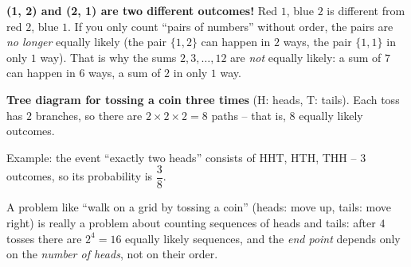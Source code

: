 \begin{warnbox}
\textbf{(1, 2) and (2, 1) are two different outcomes!} Red $1$, blue $2$ is different from red $2$, blue $1$. If you only count ``pairs of numbers'' without order, the pairs are \emph{no longer} equally likely (the pair $\{1,2\}$ can happen in $2$ ways, the pair $\{1,1\}$ in only $1$ way). That is why the sums $2,3,\dots,12$ are \emph{not} equally likely: a sum of $7$ can happen in $6$ ways, a sum of $2$ in only $1$ way.
\end{warnbox}

\textbf{Tree diagram for tossing a coin three times} (H: heads, T: tails). Each toss has $2$ branches, so there are $2\times2\times2=8$ paths -- that is, $8$ equally likely outcomes.
\begin{center}\end{center}
Example: the event ``exactly two heads'' consists of HHT, HTH, THH -- $3$ outcomes, so its probability is $\dfrac38$.

\begin{tipbox}
A problem like ``walk on a grid by tossing a coin'' (heads: move up, tails: move right) is really a problem about counting sequences of heads and tails: after $4$ tosses there are $2^4=16$ equally likely sequences, and the \emph{end point} depends only on the \emph{number of heads}, not on their order.
\end{tipbox}

